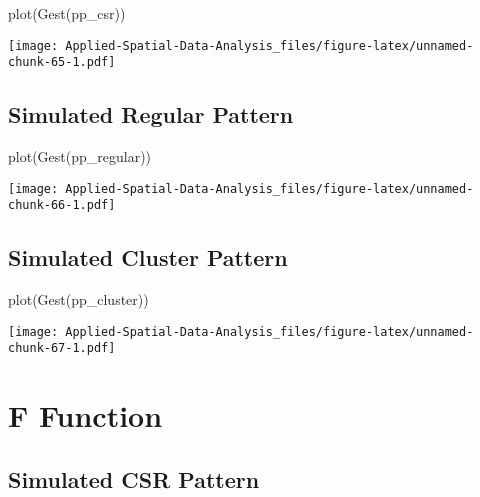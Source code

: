 \documentclass[
]{book}
\newenvironment{Shaded}{\begin{snugshade}}{\end{snugshade}}
\newcommand{\FunctionTok}[1]{\textcolor[rgb]{0.00,0.00,0.00}{#1}}
\newcommand{\NormalTok}[1]{#1}
\begin{document}
\begin{Shaded}
\begin{Highlighting}[]
\FunctionTok{plot}\NormalTok{(}\FunctionTok{Gest}\NormalTok{(pp\_csr))}
\end{Highlighting}
\end{Shaded}

\texttt{[image: Applied-Spatial-Data-Analysis\_files/figure-latex/unnamed-chunk-65-1.pdf]}

\hypertarget{simulated-regular-pattern-2}{%
\subsection{Simulated Regular Pattern}\label{simulated-regular-pattern-2}}

\begin{Shaded}
\begin{Highlighting}[]
\FunctionTok{plot}\NormalTok{(}\FunctionTok{Gest}\NormalTok{(pp\_regular))}
\end{Highlighting}
\end{Shaded}

\texttt{[image: Applied-Spatial-Data-Analysis\_files/figure-latex/unnamed-chunk-66-1.pdf]}

\hypertarget{simulated-cluster-pattern-2}{%
\subsection{Simulated Cluster Pattern}\label{simulated-cluster-pattern-2}}

\begin{Shaded}
\begin{Highlighting}[]
\FunctionTok{plot}\NormalTok{(}\FunctionTok{Gest}\NormalTok{(pp\_cluster))}
\end{Highlighting}
\end{Shaded}

\texttt{[image: Applied-Spatial-Data-Analysis\_files/figure-latex/unnamed-chunk-67-1.pdf]}

\hypertarget{f-function}{%
\section{F Function}\label{f-function}}

\hypertarget{simulated-csr-pattern-3}{%
\subsection{Simulated CSR Pattern}\label{simulated-csr-pattern-3}}
\end{document}
